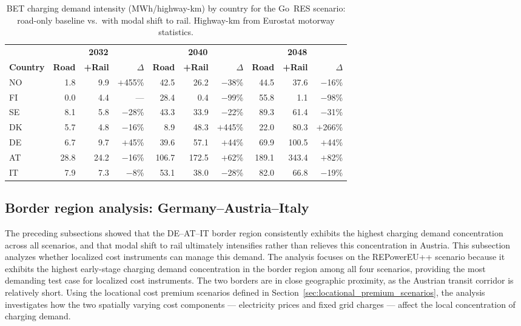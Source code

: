     \begin{table}[H]
    \centering
    \caption{\ac{BET} charging demand intensity (MWh/highway-km) by country for the Go~RES scenario: road-only baseline vs.\ with modal shift to rail. Highway-km from Eurostat motorway statistics.}
    \label{tab:rail_intensity}
    \begin{tabular}{@{}lrrrrrrrrr@{}}
    \toprule
     & \multicolumn{3}{c}{\textbf{2032}} & \multicolumn{3}{c}{\textbf{2040}} & \multicolumn{3}{c}{\textbf{2048}} \\
    \cmidrule(lr){2-4} \cmidrule(lr){5-7} \cmidrule(lr){8-10}
    \textbf{Country} & \textbf{Road} & \textbf{+Rail} & \textbf{$\Delta$} & \textbf{Road} & \textbf{+Rail} & \textbf{$\Delta$} & \textbf{Road} & \textbf{+Rail} & \textbf{$\Delta$} \\ \midrule
      NO &   1.8 &   9.9 & $+$455\% &  42.5 &  26.2 & $-$38\% &  44.5 &  37.6 & $-$16\% \\
      FI &   0.0 &   4.4 & --- &  28.4 &   0.4 & $-$99\% &  55.8 &   1.1 & $-$98\% \\
      SE &   8.1 &   5.8 & $-$28\% &  43.3 &  33.9 & $-$22\% &  89.3 &  61.4 & $-$31\% \\
      DK &   5.7 &   4.8 & $-$16\% &   8.9 &  48.3 & $+$445\% &  22.0 &  80.3 & $+$266\% \\
      DE &   6.7 &   9.7 & $+$45\% &  39.6 &  57.1 & $+$44\% &  69.9 & 100.5 & $+$44\% \\
      AT &  28.8 &  24.2 & $-$16\% & 106.7 & 172.5 & $+$62\% & 189.1 & 343.4 & $+$82\% \\
      IT &   7.9 &   7.3 & $-$8\% &  53.1 &  38.0 & $-$28\% &  82.0 &  66.8 & $-$19\% \\
    \bottomrule
    \end{tabular}
    \end{table}

\subsection{Border region analysis: Germany--Austria--Italy}

    The preceding subsections showed that the DE--AT--IT border region consistently exhibits the highest charging demand concentration across all scenarios, and that modal shift to rail ultimately intensifies rather than relieves this concentration in Austria. This subsection analyzes whether localized cost instruments can manage this demand. The analysis focuses on the REPowerEU++ scenario because it exhibits the highest early-stage charging demand concentration in the border region among all four scenarios, providing the most demanding test case for localized cost instruments. The two borders are in close geographic proximity, as the Austrian transit corridor is relatively short. Using the locational cost premium scenarios defined in Section~\ref{sec:locational_premium_scenarios}, the analysis investigates how the two spatially varying cost components --- electricity prices and fixed grid charges --- affect the local concentration of charging demand.

